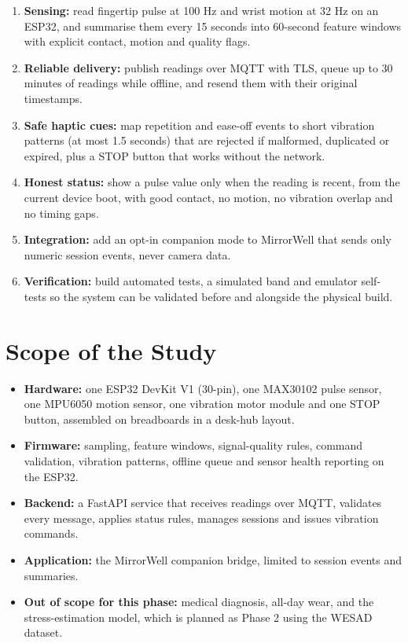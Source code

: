 \documentclass[12pt,letterpaper,oneside]{report}
\begin{document}
\begin{enumerate}\item \textbf{Sensing:} read fingertip pulse at 100 Hz and wrist motion at 32 Hz on an ESP32, and summarise them every 15 seconds into 60-second feature windows with explicit contact, motion and quality flags.
\item \textbf{Reliable delivery:} publish readings over MQTT with TLS, queue up to 30 minutes of readings while offline, and resend them with their original timestamps.
\item \textbf{Safe haptic cues:} map repetition and ease-off events to short vibration patterns (at most 1.5 seconds) that are rejected if malformed, duplicated or expired, plus a STOP button that works without the network.
\item \textbf{Honest status:} show a pulse value only when the reading is recent, from the current device boot, with good contact, no motion, no vibration overlap and no timing gaps.
\item \textbf{Integration:} add an opt-in companion mode to MirrorWell that sends only numeric session events, never camera data.
\item \textbf{Verification:} build automated tests, a simulated band and emulator self-tests so the system can be validated before and alongside the physical build.
\end{enumerate}

\section{Scope of the Study}\label{sec:1.5}

\begin{itemize}\item \textbf{Hardware:} one ESP32 DevKit V1 (30-pin), one MAX30102 pulse sensor, one MPU6050 motion sensor, one vibration motor module and one STOP button, assembled on breadboards in a desk-hub layout.
\item \textbf{Firmware:} sampling, feature windows, signal-quality rules, command validation, vibration patterns, offline queue and sensor health reporting on the ESP32.
\item \textbf{Backend:} a FastAPI service that receives readings over MQTT, validates every message, applies status rules, manages sessions and issues vibration commands.
\item \textbf{Application:} the MirrorWell companion bridge, limited to session events and summaries.
\item \textbf{Out of scope for this phase:} medical diagnosis, all-day wear, and the stress-estimation model, which is planned as Phase 2 using the WESAD dataset.
\end{itemize}
\end{document}
